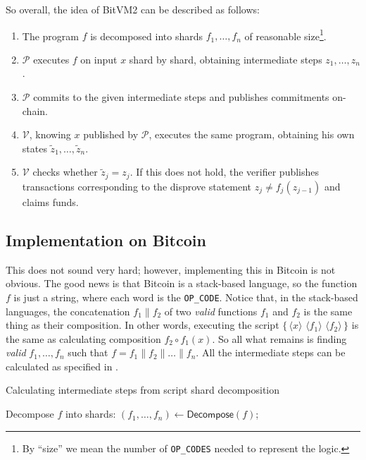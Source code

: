 \documentclass{iacrtrans}
\newcommand{\elem}[1]{\, \langle #1 \rangle \,}
\newcommand{\script}[1]{ $\big\{ #1 \big\}$ }
\begin{document}
So overall, the idea of BitVM2 can be described as follows:
\begin{enumerate}
    \item The program $f$ is decomposed into shards $f_1,\dots,f_n$ of reasonable size\footnote{By ``size'' we mean the number of \texttt{OP\_CODES} needed to represent the logic.}.
    \item $\mathcal{P}$ executes $f$ on input ${x}$ shard by shard, obtaining intermediate steps ${z}_1,\dots,{z}_n$.
    \item $\mathcal{P}$ commits to the given intermediate steps and publishes commitments on-chain.
    \item $\mathcal{V}$, knowing ${x}$ published by $\mathcal{P}$, executes the same program, obtaining his own states $\widetilde{z}_1,\dots,\widetilde{z}_n$.
    \item $\mathcal{V}$ checks whether $\widetilde{z}_j = z_j$. If this does not hold, the verifier publishes transactions corresponding to the disprove statement $z_j \neq f_j(z_{j-1})$ and claims funds.
\end{enumerate}

\subsection{Implementation on Bitcoin}

This does not sound very hard; however, 
implementing this in Bitcoin is not obvious. 
The good news is that Bitcoin is a stack-based language, 
so the function $f$ is just a string, 
where each word is the \texttt{OP\_CODE}. Notice that, 
in the stack-based languages, the concatenation 
$f_1 \parallel f_2$ of two \textit{valid} functions 
$f_1$ and $f_2$ is the same thing as their composition. 
In other words, executing the script \script{\elem{x} \elem{f_1} \elem{f_2}}
is the same as calculating composition $f_2 \circ f_1(x)$. 
So all what remains is finding \textit{valid} $f_1,\dots,f_n$ such that $f = f_1 \parallel f_{2} \parallel \dots \parallel f_n$. All the intermediate steps can be calculated as specified in .

\begin{algorithm}[H]
\caption{Calculating intermediate steps from script shard decomposition}

Decompose $f$ into shards: $(f_1,\dots,f_n) \gets \mathsf{Decompose}(f)$;

\For{$i \in \{1,\dots,n\}$}{
    $z_i \gets \mathsf{Exec}(\{\elem{z_{i-1}} \elem{f_i}\})$;
}

\label{alg:intermediate_steps}
\end{algorithm}
\end{document}
